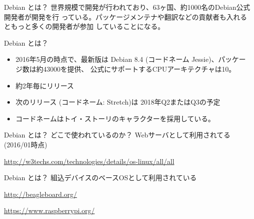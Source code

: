 \begin{frame}{Debian とは？}
 世界規模で開発が行われており、63ヶ国、約1000名のDebian公式開発者が開発を行
 っている。パッケージメンテナや翻訳などの貢献者も入れるともっと多くの開発者が参加
 していることになる。
\end{frame}

\begin{frame}{Debian とは？}
\begin{itemize}[<+->]
 \item 2016年5月の時点で、\pause 最新版は Debian 8.4 (コードネーム Jessie)、\pause パッケージ数は約43000を提供、\pause
 公式にサポートするCPUアーキテクチャは10。\pause
 \item 約2年毎にリリース
 \item 次のリリース (コードネーム: Stretch)は 2018年Q2またはQ3の予定
 \item コードネームはトイ・ストーリのキャラクターを採用している。
\end{itemize}
\end{frame}


\begin{frame}{Debian とは？}
どこで使われているのか？\pause
Webサーバとして利用されてる(2016/01時点)

  \tiny{\url{http://w3techs.com/technologies/details/os-linux/all/all}}

\end{frame}

\begin{frame}{Debian とは？}
組込デバイスのベースOSとして利用されている

 \url{http://beagleboard.org/}

 \url{https://www.raspberrypi.org/}

 \end{frame}

